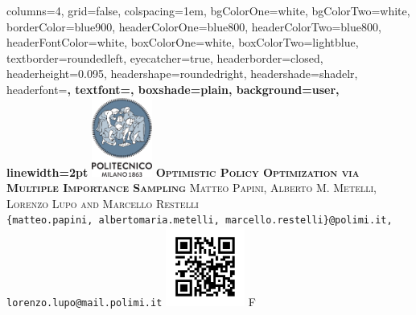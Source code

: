 \documentclass[landscape,a0paper,fontscale=0.35]{baposter}
\begin{document}
\begin{poster}%
  {
  columns=4,
  grid=false,
  colspacing=1em,
  bgColorOne=white,
  bgColorTwo=white,
  borderColor=blue900,
  headerColorOne=blue800,
  headerColorTwo=blue800,
  headerFontColor=white,
  boxColorOne=white,
  boxColorTwo=lightblue,
  textborder=roundedleft,
  eyecatcher=true,
  headerborder=closed,
  headerheight=0.095\textheight,
  headershape=roundedright,
  headershade=shadelr,
  headerfont=\large\bf\textsc, %
  textfont={\setlength{\parindent}{1.5em}},
  boxshade=plain,
  background=user,
  linewidth=2pt
  }
  {\hspace{0.5cm} \includegraphics[height=7.0em]{./pics/polilogo/logoPoliBlue_poster.png} \hspace{2cm}}
  {\bf\textsc{Optimistic Policy Optimization via Multiple Importance Sampling}\vspace{0.1em}}
  {\textsc{Matteo Papini, Alberto M. Metelli, Lorenzo Lupo and Marcello Restelli}\\ 
  {\normalsize \texttt{\{matteo.papini, albertomaria.metelli, marcello.restelli\}@polimi.it, lorenzo.lupo@mail.polimi.it}}
  }
  {%
    {\includegraphics[height=7.0em]{../talk/qr.png}}
F  }


\end{poster}
\end{document}
